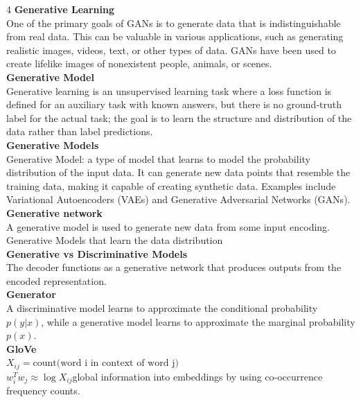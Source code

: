 \documentclass[8pt]{extarticle}
\begin{document}
\begin{multicols}{4}
\vspace{2pt}\textbf{Generative Learning}\\
One of the primary goals of GANs is to generate data that is indistinguishable from real data. This can be valuable in various applications, such as generating realistic images, videos, text, or other types of data. GANs have been used to create lifelike images of nonexistent people, animals, or scenes.\\
\vspace{2pt}\textbf{Generative Model}\\
Generative learning is an unsupervised learning task where a loss function is defined for an auxiliary task with known answers, but there is no ground-truth label for the actual task; the goal is to learn the structure and distribution of the data rather than label predictions.\\
\vspace{2pt}\textbf{Generative Models}\\
Generative Model: a type of model that learns to model the probability distribution of the input data. It can generate new data points that resemble the training data, making it capable of creating synthetic data. Examples include Variational Autoencoders (VAEs) and Generative Adversarial Networks (GANs).\\
\vspace{2pt}\textbf{Generative network}\\
A generative model is used to generate new data from some input encoding.\\
Generative Models that learn the data distribution\\
\vspace{2pt}\textbf{Generative vs Discriminative Models}\\
The decoder functions as a generative network that produces outputs from the encoded representation.\\
\vspace{2pt}\textbf{Generator}\\
A discriminative model learns to approximate the conditional probability $p(y|x)$, while a generative model learns to approximate the marginal probability $p(x)$.\\
\vspace{2pt}\textbf{GloVe}\\
$X_{ij} = \text{count(word i in context of word j)}$\\
$w_i^{T} w_j \approx \log X_{ij}$\Enforces global information into embeddings by using co-occurrence frequency counts.\\

\end{multicols}
\end{document}
